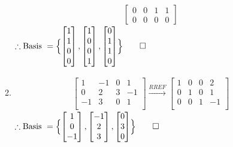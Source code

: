 \documentclass[12pt, a4paper]{article}
\begin{document}
\begin{enumerate}[Q\arabic*.]
\begin{enumerate}[(\alph*)]
\begin{align*}
\begin{bmatrix}
            0 & 0 & 1 & 1\\
            0 & 0 & 0 & 0
          \end{bmatrix}
        \end{align*}
        $\therefore \text{Basis } =\Bigl\{\begin{bmatrix}1\\1\\0\\0\end{bmatrix},\begin{bmatrix}1\\0\\0\\1\end{bmatrix},\begin{bmatrix}0\\1\\1\\0\end{bmatrix}\Bigr\}\qed$


      \item 
        \begin{align*}
          \begin{bmatrix}
            1 & -1 & 0 & 1\\
            0 & 2 & 3 & -1\\
            -1 & 3 & 0 & 1\\
          \end{bmatrix} \xrightarrow{RREF}
          \begin{bmatrix}
            1 & 0 & 0 & 2\\
            0 & 1 & 0 & 1\\
            0 & 0 & 1 & -1\\
          \end{bmatrix}
        \end{align*}
        $\therefore \text{Basis } =\Bigl\{\begin{bmatrix}1\\0\\-1\end{bmatrix},\begin{bmatrix}-1\\2\\3\end{bmatrix},\begin{bmatrix}0\\3\\0\end{bmatrix}\Bigr\}\qed$


\end{enumerate}
\end{enumerate}
\end{document}

